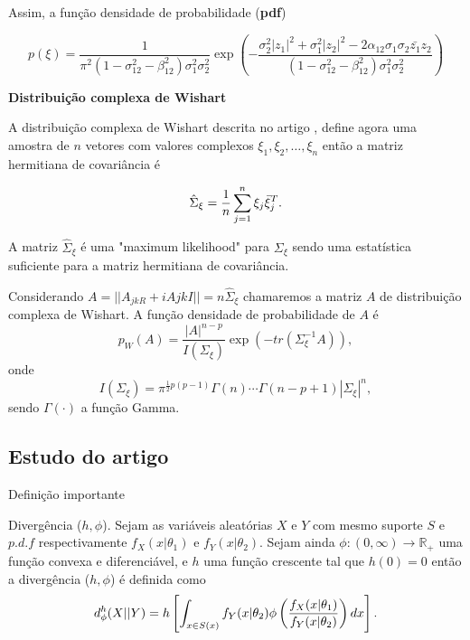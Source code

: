 Assim, a função densidade de probabilidade ({\bf pdf}) 

\begin{equation}\label{eqn79}
	p(\xi)=\frac{1}{\pi^2(1 - \sigma_{12}^{2}- \beta_{12}^2)\sigma_{1}^2\sigma_{2}^2}\exp\left(-\frac{\sigma_2^2|z_1|^2+\sigma_1^2|z_2|^2-2\alpha_{12}\sigma_1\sigma_2\bar{z_1}z_2}{(1 - \sigma_{12}^{2}- \beta_{12}^2)\sigma_{1}^2\sigma_{2}^2}
\right)  
\end{equation}

{\bf Distribuição complexa de Wishart}

A distribuição complexa de Wishart descrita no artigo \cite{good}, define agora uma amostra de  $n$ vetores com valores complexos $\xi_1,\xi_2,\dots,\xi_n$ então a matriz hermitiana de covariância é 

\begin{equation}\label{eqn80}
	\hat{\Sigma}_{\xi}=\frac{1}{n}\sum_{j=1}^{n}\xi_j\bar{\xi}_{j}^{T} . \\
\end{equation}

A matriz $\hat{\Sigma}_{\xi}$ é uma "maximum likelihood" para $\Sigma_{\xi}$ sendo uma estatística suficiente para a matriz hermitiana de covariância.

Considerando $A=||A_{jkR}+iA{jkI}||=n\hat{\Sigma}_{\xi}$ chamaremos a matriz $A$ de distribuição complexa de Wishart. A função densidade de probabilidade de $A$ é
\begin{equation}\label{eqn81}
	p_W(A)=\frac{|A|^{n-p}}{I(\Sigma_{\xi})} \exp(-tr(\Sigma_{\xi}^{-1}A)), 
\end{equation}
onde
\begin{equation}\label{eqn82}
	I(\Sigma_{\xi})=\pi^{\frac{1}{2}p(p-1)}\Gamma(n)\cdots\Gamma(n-p+1)|\Sigma_{\xi}|^n, 
\end{equation}
sendo $\Gamma(\cdot)$ a função Gamma.

\subsection{Estudo do artigo  \cite{smp}}

Definição importante  

\begin{definition}{Divergência ($h,\phi$).}
	Sejam as variáveis aleatórias $X$ e $Y$ com mesmo suporte $S$  e $p.d.f$ respectivamente $f_{X}(x|\theta_1)$ e $f_{Y}(x|\theta_2)$. Sejam ainda $\phi:(0,\infty)\rightarrow \mathbb{R}_+$ uma função convexa e diferenciável, e $h$ uma função crescente tal que $h(0)=0$ então a divergência ($h,\phi$) é definida como
\begin{equation}\label{eqn83}
	d_{\phi}^{h}(X||Y)=h\left[\int_{x\in S(x)} f_{Y}(x|\theta_2)\phi\left(\frac{f_{X}(x|\theta_1)}{f_{Y}(x|\theta_2)}\right)dx \right]. \\
\end{equation}
\end{definition}


